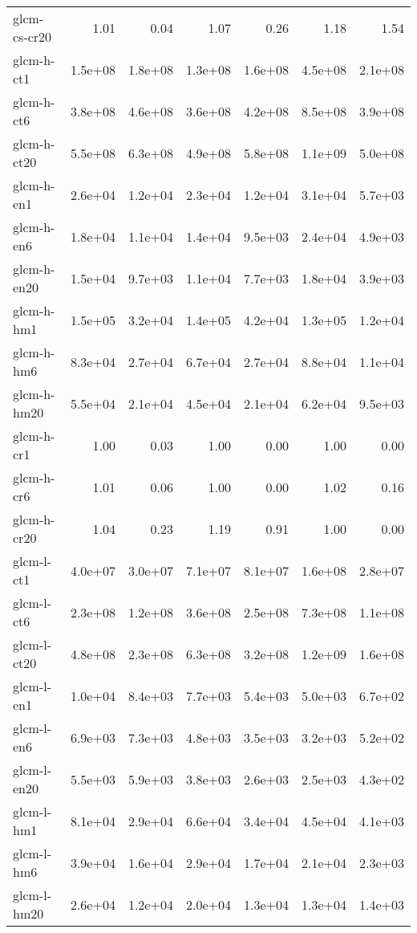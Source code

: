 \begin{tabular}{lrrrrrr}
glcm-cs-cr20        &    1.01 &    0.04 &    1.07 &    0.26 &    1.18 &    1.54 \\
glcm-h-ct1          & 1.5e+08 & 1.8e+08 & 1.3e+08 & 1.6e+08 & 4.5e+08 & 2.1e+08 \\
glcm-h-ct6          & 3.8e+08 & 4.6e+08 & 3.6e+08 & 4.2e+08 & 8.5e+08 & 3.9e+08 \\
glcm-h-ct20         & 5.5e+08 & 6.3e+08 & 4.9e+08 & 5.8e+08 & 1.1e+09 & 5.0e+08 \\
glcm-h-en1          & 2.6e+04 & 1.2e+04 & 2.3e+04 & 1.2e+04 & 3.1e+04 & 5.7e+03 \\
glcm-h-en6          & 1.8e+04 & 1.1e+04 & 1.4e+04 & 9.5e+03 & 2.4e+04 & 4.9e+03 \\
glcm-h-en20         & 1.5e+04 & 9.7e+03 & 1.1e+04 & 7.7e+03 & 1.8e+04 & 3.9e+03 \\
glcm-h-hm1          & 1.5e+05 & 3.2e+04 & 1.4e+05 & 4.2e+04 & 1.3e+05 & 1.2e+04 \\
glcm-h-hm6          & 8.3e+04 & 2.7e+04 & 6.7e+04 & 2.7e+04 & 8.8e+04 & 1.1e+04 \\
glcm-h-hm20         & 5.5e+04 & 2.1e+04 & 4.5e+04 & 2.1e+04 & 6.2e+04 & 9.5e+03 \\
glcm-h-cr1          &    1.00 &    0.03 &    1.00 &    0.00 &    1.00 &    0.00 \\
glcm-h-cr6          &    1.01 &    0.06 &    1.00 &    0.00 &    1.02 &    0.16 \\
glcm-h-cr20         &    1.04 &    0.23 &    1.19 &    0.91 &    1.00 &    0.00 \\
glcm-l-ct1          & 4.0e+07 & 3.0e+07 & 7.1e+07 & 8.1e+07 & 1.6e+08 & 2.8e+07 \\
glcm-l-ct6          & 2.3e+08 & 1.2e+08 & 3.6e+08 & 2.5e+08 & 7.3e+08 & 1.1e+08 \\
glcm-l-ct20         & 4.8e+08 & 2.3e+08 & 6.3e+08 & 3.2e+08 & 1.2e+09 & 1.6e+08 \\
glcm-l-en1          & 1.0e+04 & 8.4e+03 & 7.7e+03 & 5.4e+03 & 5.0e+03 & 6.7e+02 \\
glcm-l-en6          & 6.9e+03 & 7.3e+03 & 4.8e+03 & 3.5e+03 & 3.2e+03 & 5.2e+02 \\
glcm-l-en20         & 5.5e+03 & 5.9e+03 & 3.8e+03 & 2.6e+03 & 2.5e+03 & 4.3e+02 \\
glcm-l-hm1          & 8.1e+04 & 2.9e+04 & 6.6e+04 & 3.4e+04 & 4.5e+04 & 4.1e+03 \\
glcm-l-hm6          & 3.9e+04 & 1.6e+04 & 2.9e+04 & 1.7e+04 & 2.1e+04 & 2.3e+03 \\
glcm-l-hm20         & 2.6e+04 & 1.2e+04 & 2.0e+04 & 1.3e+04 & 1.3e+04 & 1.4e+03 \\

\end{tabular}
